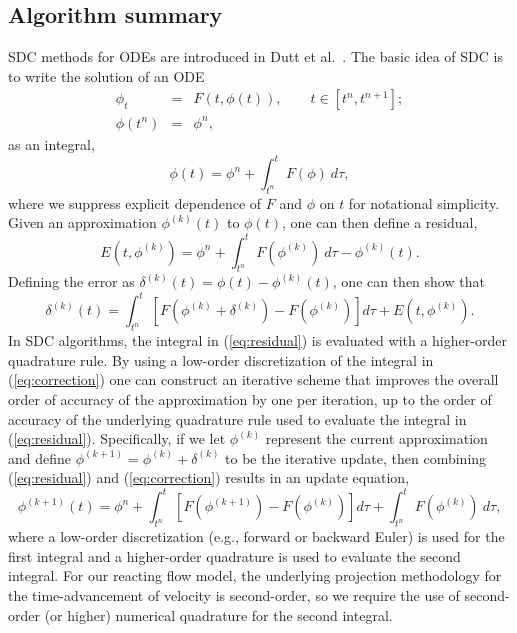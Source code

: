 \subsection{Algorithm summary}
\label{AlgoDetails}
SDC methods for ODEs are introduced in Dutt et al.~\cite{Dutt:2000}.
The basic idea of SDC is to write the solution of an ODE
\begin{eqnarray}
\phi_t &=& F(t,\phi(t)), \qquad t\in[t^n,t^{n+1}];\\
\phi(t^n) &=& \phi^n,
\end{eqnarray}
as an integral,
\begin{equation}
\phi(t) = \phi^n + \int_{t^n}^{t} F(\phi)~d\tau,
\end{equation}
where we suppress explicit dependence of $F$ and $\phi$ on $t$ for notational simplicity.
Given an approximation $\phi^{(k)}(t)$ to $\phi(t)$, one can then define a residual,
\begin{equation}
E(t,\phi^{(k)}) = \phi^n + \int_{t^n}^t F(\phi^{(k)})~d\tau - \phi^{(k)}(t).\label{eq:residual}
\end{equation}
Defining the error as $\delta^{(k)}(t) = \phi(t) - \phi^{(k)}(t)$, one can then show that
\begin{equation}
\delta^{(k)}(t) = \int_{t^n}^t \left[F(\phi^{(k)}+ \delta^{(k)}) - F(\phi^{(k)})\right]d\tau + E(t,\phi^{(k)}).\label{eq:correction}
\end{equation}
In SDC algorithms, the integral in (\ref{eq:residual}) 
is evaluated with a higher-order quadrature rule.
By using a low-order discretization of the integral in (\ref{eq:correction}) one can construct
an iterative scheme that improves the overall order of accuracy of the approximation by one per
iteration, up to the order of accuracy of the underlying quadrature rule 
used to evaluate the integral in (\ref{eq:residual}).
Specifically, if we let $\phi^{(k)}$ represent the current approximation and define 
$\phi^{(k+1)} = \phi^{(k)} + \delta^{(k)}$ to be the iterative update, 
then combining (\ref{eq:residual}) and (\ref{eq:correction}) results in an update equation,
\begin{equation}
\phi^{(k+1)}(t) = \phi^n + \int_{t^n}^t \left[F(\phi^{(k+1)}) - F(\phi^{(k)})\right]d\tau +
 \int_{t^n}^t F(\phi^{(k)})~d\tau,\label{eq:update}
\end{equation}
where a low-order discretization (e.g., forward or backward Euler) is used for the first integral 
and a higher-order quadrature is used to evaluate the second integral.  For our reacting flow model,
the underlying projection methodology for the time-advancement of velocity is second-order,
so we require the use of second-order (or higher) numerical quadrature for the second integral.

